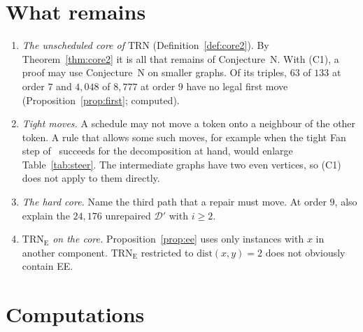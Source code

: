 \documentclass[11pt]{amsart}
\theoremstyle{definition}
\newcommand{\cD}{\mathcal D}
\newcommand{\TRN}{\mathrm{TRN}}
\newcommand{\TRNE}{\mathrm{TRN}_{\mathrm E}}
\begin{document}
\section{What remains}\label{sec:open}
\begin{enumerate}
\item \emph{The unscheduled core of $\TRN$} (Definition~\ref{def:core2}). By
Theorem~\ref{thm:core2} it is all that remains of Conjecture~N. With (C1), a proof may use
Conjecture~N on smaller graphs. Of its triples, $63$ of $133$ at order $7$ and $4{,}048$ of $8{,}777$
at order $9$ have no legal first move (Proposition~\ref{prop:first}; computed).
\item \emph{Tight moves.} A schedule may not move a token onto a neighbour of the other token. A
rule that allows some such moves, for example when the tight Fan step of~\cite{TF} succeeds for the
decomposition at hand, would enlarge Table~\ref{tab:steer}. The intermediate graphs have two even
vertices, so (C1) does not apply to them directly.
\item \emph{The hard core.} Name the third path that a repair must move. At order $9$, also
explain the $24{,}176$ unrepaired $\cD'$ with $i\ge2$.
\item \emph{$\TRNE$ on the core.} Proposition~\ref{prop:ee} uses only instances with $x$ in another
component. $\TRNE$ restricted to $\mathrm{dist}(x,y)=2$ does not obviously contain EE.
\end{enumerate}

\section{Computations}\label{sec:comp}
\end{document}
